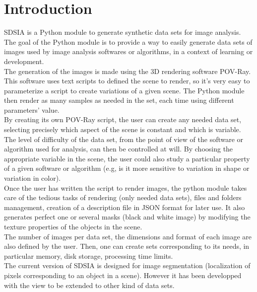 \section*{Introduction}

SDSIA is a Python module to generate synthetic data sets for image analysis.\\

The goal of the Python module is to provide a way to easily generate data sets of images used by image analysis softwares or algorithms, in a context of learning or development.\\

The generation of the images is made using the 3D rendering software POV-Ray. This software uses text scripts to defined the scene to render, so it's very easy to parameterize a script to create variations of a given scene. The Python module then render as many samples as needed in the set, each time using different parameters' value.\\

By creating its own POV-Ray script, the user can create any needed data set, selecting precisely which aspect of the scene is constant and which is variable. The level of difficulty of the data set, from the point of view of the software or algorithm used for analysis, can then be controlled at will. By choosing the appropriate variable in the scene, the user could also study a particular property of a given software or algorithm (e.g, is it more sensitive to variation in shape or variation in color).\\

Once the user has written the script to render images, the python module takes care of the tedious tasks of rendering (only needed data sets), files and folders management, creation of a description file in JSON format for later use. It also generates perfect one or several masks (black and white image) by modifying the texture properties of the objects in the scene.\\

The number of images per data set, the dimensions and format of each image are also defined by the user. Then, one can create sets corresponding to its needs, in particular memory, disk storage, processing time limits.\\

The current version of SDSIA is designed for image segmentation (localization of pixels corresponding to an object in a scene). However it has been developped with the view to be extended to other kind of data sets.\\

